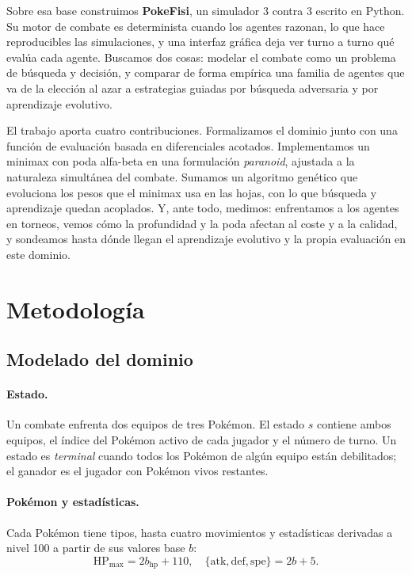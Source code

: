 \documentclass[11pt]{article}
\begin{document}
Sobre esa base construimos \textbf{PokeFisi}, un simulador 3 contra 3 escrito en
Python. Su motor de combate es determinista cuando los agentes razonan, lo que
hace reproducibles las simulaciones, y una interfaz gráfica deja ver turno a turno
qué evalúa cada agente. Buscamos dos cosas: modelar el combate como un problema de
búsqueda y decisión, y comparar de forma empírica una familia de agentes que va de
la elección al azar a estrategias guiadas por búsqueda adversaria y por
aprendizaje evolutivo.

El trabajo aporta cuatro contribuciones. Formalizamos el dominio junto con una
función de evaluación basada en diferenciales acotados. Implementamos un minimax
con poda alfa-beta \citep{knuth1975} en una formulación \emph{paranoid}, ajustada
a la naturaleza simultánea del combate. Sumamos un algoritmo genético
\citep{holland1992,goldberg1989} que evoluciona los pesos que el minimax usa en
las hojas, con lo que búsqueda y aprendizaje quedan acoplados. Y, ante todo,
medimos: enfrentamos a los agentes en torneos, vemos cómo la profundidad y la poda
afectan al coste y a la calidad, y sondeamos hasta dónde llegan el aprendizaje
evolutivo y la propia evaluación en este dominio.

\section{Metodología}

\subsection{Modelado del dominio}

\paragraph{Estado.} Un combate enfrenta dos equipos de tres Pokémon. El estado
$s$ contiene ambos equipos, el índice del Pokémon activo de cada jugador y el
número de turno. Un estado es \emph{terminal} cuando todos los Pokémon de algún
equipo están debilitados; el ganador es el jugador con Pokémon vivos restantes.

\paragraph{Pokémon y estadísticas.} Cada Pokémon tiene tipos, hasta cuatro
movimientos y estadísticas derivadas a nivel 100 a partir de sus valores base
$b$:
\[
\text{HP}_{\max}=2b_{\text{hp}}+110,\quad
\{\text{atk},\text{def},\text{spe}\}=2b+5 .
\]
\end{document}
